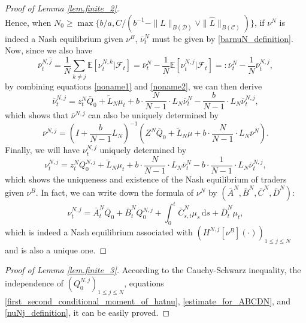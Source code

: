 \documentclass[10pt]{article}
\begin{document}
\begin{proof}[Proof of Lemma \ref{lem.finite_2}]
\begin{equation}
\end{equation}
Hence, when $N_0 \geq \max \{ b/a, C/(b^{-1} - \|L\|_{B(\mathcal{D})} \vee \|\hat L\|_{B(\mathcal{C})}) \}$, if $\nu^N$ is indeed a Nash equilibrium given $\nu^B$, $\bar \nu^N_t$ must be given by \eqref{barnuN_definition}. Now, since we also have
\begin{equation}\label{noname2}
    \bar \nu_t^{N, \hat{j}} = \frac{1}{N} \sum_{k \neq j} \mathbb{E}[\nu^{N,k}_t | \mathcal{F}_t] = \bar \nu^N_t - \frac{1}{N} \mathbb{E}[\nu^{N,j}_t | \mathcal{F}_t] =: \bar \nu^N_t - \frac{1}{N} \bar \nu_t^{N,j},
\end{equation}
by combining equations \eqref{noname1} and \eqref{noname2}, we can then derive
\begin{equation}
    \bar \nu^{N,j}_t = z_t^N \bar Q_0 + \tilde L_N \mu_t + b \cdot \frac{N}{N-1} \cdot L_N \bar \nu_t^N - \frac{b}{N-1} \cdot L_N \bar \nu_t^{N,j},
\end{equation}
which shows that $\bar \nu^{N,j}$ can also be uniquely determined by 
\begin{equation*}
    \bar \nu^{N,j} = (I + \frac{b}{N-1} L_N )^{-1} \left( Z^N \bar Q_0 + \tilde L_N \mu + b \cdot \frac{N}{N-1} \cdot L_N \bar \nu^N \right).
\end{equation*}
Finally, we will have $\nu_t^{N,j}$ uniquely determined by 
\begin{equation*}
    \nu_t^{N,j} = z_t^N Q_0^{N,j} + \tilde L_N \mu_t + b \cdot \frac{N}{N-1} \cdot L_N \bar \nu_t^N - b \cdot \frac{1}{N-1} \cdot L_N \bar \nu_t^{N,j},
\end{equation*}
which shows the uniqueness and existence of the Nash equilibrium of traders given $\nu^B$. In fact, we can write down the formula of $\nu^N$ by $(\bar A^N, \bar B^N, \bar C^N, \bar D^N)$:
\begin{equation}\label{nuNj_definition}
    \nu^{N,j}_t = \bar A_t^N \bar Q_0 + \bar B_t^N Q_0^{N,j} + \int_0^t \bar C_{s,t}^N \mu_s \, \mathrm{d}s + \bar D_t^N \mu_t,
\end{equation}
which is indeed a Nash equilibrium associated with $(H^{N,j}[\nu^B](\cdot))_{1 \leq j \leq N}$ and is also a unique one.

\end{proof}

\begin{proof}[Proof of Lemma \ref{lem.finite_3}]

According to the Cauchy-Schwarz inequality, the independence of $\left(Q_0^{N,j}\right)_{1 \leq j \leq N}$, equations \eqref{first_second_conditional_moment_of_hatnu}, \eqref{estimate_for_ABCDN}, and \eqref{nuNj_definition}, it can be easily proved.

\end{proof}
\end{document}
